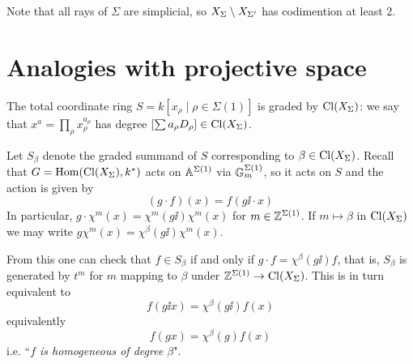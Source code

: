 \begin{remark}
Note that all rays of $\Sigma$ are simplicial, so $X_\Sigma\setminus X_{\Sigma'}$ has codimention at least 2.
\end{remark}


\section{Analogies with projective space}

The total coordinate ring $S=k[x_\rho\mid \rho\in\Sigma(1)]$ is graded by $\operatorname{Cl}(X_\Sigma)$: we say that $x^a=\prod_\rho x_\rho^{a_\rho}$ has degree $[\sum a_\rho D_\rho]\in \operatorname{Cl}(X_\Sigma)$.

Let $S_\beta$ denote the graded summand of $S$ corresponding to $\beta\in \operatorname{Cl}(X_\Sigma)$. Recall that $G=\operatorname{Hom}(\operatorname{Cl}(X_\Sigma),k^\ast)$ acts on $\mathbb{A}^{\Sigma(1)}$ via $\mathbb{G}_m^{\Sigma(1)}$, so it acts on $S$ and the action is given by
\[(g\cdot f)(x)=f(g\ii\cdot x)\]
In particular, $g\cdot \chi^m(x)=\chi^m(g\ii)\chi^m(x)$ for $m\in \mathbb{Z}^{\Sigma(1)}$. If $m\mapsto \beta$ in $\operatorname{Cl}(X_\Sigma)$ we may write $g\chi^m(x)=\chi^\beta(g\ii)\chi^m(x)$.

From this one can check that $f\in S_\beta$ if and only if $g\cdot f=\chi^\beta(g\ii) f$, that is, $S_\beta$ is generated by $t^m$ for $m$ mapping to $\beta$ under $\mathbb{Z}^{\Sigma(1)}\to \operatorname{Cl}(X_\Sigma)$. This is in turn equivalent to
\[f(g\ii x)=\chi^\beta(g\ii)f(x)\]
equivalently
\[f(gx)=\chi^\beta(g)f(x)\]
i.e. ``\textit{$f$ is homogeneous of degree $\beta$}".












